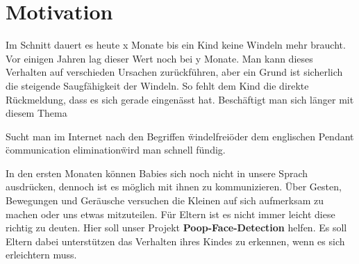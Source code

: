 \section{Motivation}
\label{sec:Motivation}
Im Schnitt dauert es heute x Monate bis ein Kind keine Windeln mehr braucht. Vor einigen Jahren lag dieser Wert noch bei y Monate. Man kann dieses Verhalten auf verschieden Ursachen zurückführen, aber ein Grund ist sicherlich die steigende Saugfähigkeit der Windeln. So fehlt dem Kind die direkte Rückmeldung, dass es sich gerade eingenässt hat. Beschäftigt man sich länger mit diesem Thema 


Sucht man im Internet nach den Begriffen \"windelfrei\" oder dem englischen Pendant \"communication elimination\" wird man schnell fündig.

In den ersten Monaten können Babies sich noch nicht in unsere Sprach ausdrücken, dennoch ist es möglich mit ihnen zu kommunizieren. Über Gesten, Bewegungen und Geräusche versuchen die Kleinen auf sich aufmerksam zu machen oder uns etwas mitzuteilen. Für Eltern ist es nicht immer leicht diese richtig zu deuten. Hier soll unser Projekt \textbf{Poop-Face-Detection} helfen. Es soll Eltern dabei unterstützen das Verhalten ihres Kindes zu erkennen, wenn es sich erleichtern muss.
